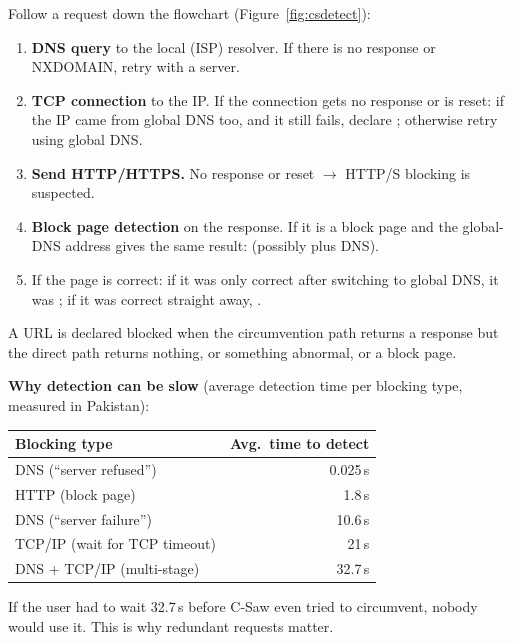Follow a request down the flowchart (Figure~\ref{fig:csdetect}):
\begin{enumerate}
  \item \textbf{DNS query} to the local (ISP) resolver. If there is no response or NXDOMAIN, retry with a  server.
  \item \textbf{TCP connection} to the IP. If the connection gets no response or is reset: if the IP came from global DNS too, and it still
        fails, declare ; otherwise retry using global DNS.
  \item \textbf{Send HTTP/HTTPS.} No response or reset $\to$ HTTP/S blocking is suspected.
  \item \textbf{Block page detection} on the response. If it is a block page and the global-DNS address gives the same result:  (possibly plus DNS).
  \item If the page is correct: if it was only correct after switching to global DNS, it was ; if it was correct straight away,
        .
\end{enumerate}
A URL is declared blocked when the circumvention path returns a response but the direct path returns nothing, or something abnormal, or a block page.

\textbf{Why detection can be slow} (average detection time per blocking type, measured in Pakistan):
\begin{center}
\begin{tabular}{@{}lr@{}}
\toprule
Blocking type & Avg.\ time to detect\\
\midrule
DNS (``server refused'') & 0.025\,s\\
HTTP (block page) & 1.8\,s\\
DNS (``server failure'') & 10.6\,s\\
TCP/IP (wait for TCP timeout) & 21\,s\\
DNS + TCP/IP (multi-stage) & 32.7\,s\\
\bottomrule
\end{tabular}
\end{center}
If the user had to wait 32.7\,s before C-Saw even tried to circumvent, nobody would use it. This is why redundant requests matter.

